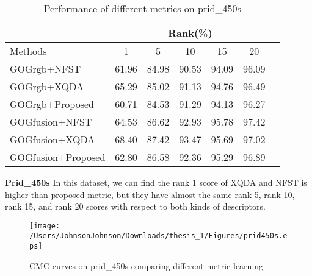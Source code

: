 \begin{table}[H]
\caption{Performance of different metrics on prid\_450s}
\centering
\begin{tabular}{|l|c|c|c|c|c|c|}
\hline
& \multicolumn{5}{|c|}{Rank(\%)} \\
\hline
Methods& 1 & 5 &10& 15&20\\
\hline
GOGrgb+NFST& 61.96&84.98 &90.53& 94.09&96.09 \\  %
\hline
GOGrgb+XQDA&65.29 &85.02 & 91.13&94.76& 96.49\\ 
\hline
GOGrgb+Proposed&60.71&84.53&91.29&94.13&96.27\\  %
\hline
GOGfusion+NFST& 64.53&86.62 & 92.93&95.78&97.42 \\ 
\hline
GOGfusion+XQDA&68.40 & 87.42&93.47 &95.69& 97.02\\ 
\hline
GOGfusion+Proposed&62.80&86.58&92.36&95.29& 96.89\\ %

\hline

\end{tabular}
\end{table}
\textbf{Prid\_450s} In this dataset, we can find the rank 1 score of XQDA and NFST is higher than proposed metric, but they have almost the same rank 5, rank 10, rank 15, and rank 20 scores with respect to both kinds of descriptors. 

\begin{figure}[H]
\begin{raggedleft}
\texttt{[image: /Users/JohnsonJohnson/Downloads/thesis\_1/Figures/prid450s.eps]}
\vspace{-3em}
\caption{CMC curves on prid\_450s comparing different metric learning}
\end{raggedleft}
\end{figure}

